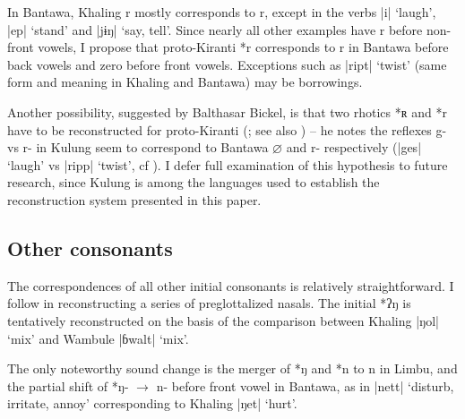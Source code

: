 \documentclass[oneside,a4paper,11pt]{article}
\newcommand{\ipa}[1]{{\phon\mbox{#1}}} %
\newcommand{\dhatu}[2]{|\ipa{#1}| `#2'}
\newcommand{\change}[2]{*\ipa{#1} $\rightarrow$ \ipa{#2}}
\begin{document}
In Bantawa, Khaling \ipa{r} mostly corresponds to \ipa{r}, except in the verbs \dhatu{i}{laugh}, \dhatu{ep}{stand} and \dhatu{jɨŋ}{say, tell}. Since nearly all other examples have \ipa{r} before non-front vowels, I propose that proto-Kiranti *\ipa{r} corresponds to \ipa{r} in Bantawa before back vowels and zero before front vowels. Exceptions such as \dhatu{ript}{twist} (same form and meaning in Khaling and Bantawa) may be borrowings.

Another possibility, suggested by Balthasar Bickel, is that two rhotics *\ipa{ʀ} and *\ipa{r} have to be reconstructed for proto-Kiranti (\citealt[75]{bickel15antipassive}; see also \citealt[34-36]{opgenort05jero}) -- he notes the reflexes \ipa{g-} vs \ipa{r-} in Kulung seem to correspond to Bantawa $\varnothing$ and \ipa{r-} respectively (\dhatu{ges}{laugh} vs \dhatu{ripp}{twist}, cf \citealt{tolsma06kulung}). I defer full examination of this hypothesis to future research, since Kulung is among the languages used to establish the reconstruction system presented in this paper.




\subsection{Other consonants}
The correspondences of all other initial consonants is relatively straightforward. I follow \citet{opgenort04implosives} in reconstructing a series of preglottalized nasals. The initial \ipa{*ʔŋ} is tentatively reconstructed on the basis of the comparison between Khaling \dhatu{ŋol}{mix} and Wambule \dhatu{ɓwalt}{mix}.

The only noteworthy sound change is the merger of *\ipa{ŋ} and *\ipa{n} to \ipa{n} in Limbu, and the partial shift of \change{ŋ-}{n-} before front vowel in Bantawa, as in \dhatu{nett}{disturb, irritate, annoy} corresponding to Khaling \dhatu{ŋet}{hurt}.
\end{document}
